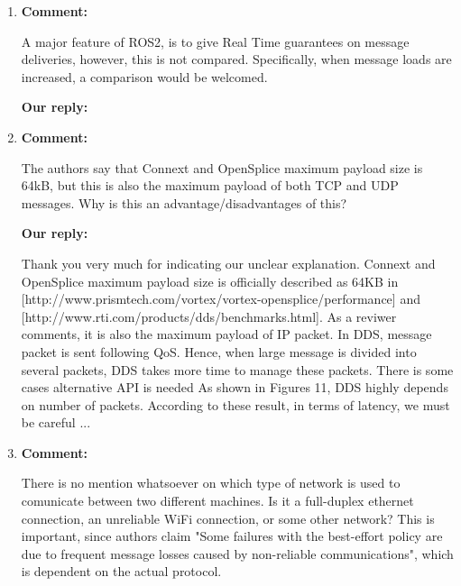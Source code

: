 \documentclass{article}
\begin{document}
\begin{enumerate}
\item \begin{flushleft}
    \textbf{Comment:}
  \end{flushleft}
  A major feature of ROS2, is to give Real Time guarantees on message deliveries, however, this is not compared. Specifically, when message loads are increased, a comparison would be welcomed.

  \begin{flushleft}
    \textbf{Our reply:}
  \end{flushleft}

\item \begin{flushleft}
    \textbf{Comment:}
  \end{flushleft}
  The authors say that Connext and OpenSplice maximum payload size is 64kB, but this is also the maximum payload of both TCP and UDP messages. Why is this an advantage/disadvantages of this?

  \begin{flushleft}
    \textbf{Our reply:}
  \end{flushleft}
  Thank you very much for indicating our unclear explanation.
  Connext and OpenSplice maximum payload size is officially described as 64KB in [http://www.prismtech.com/vortex/vortex-opensplice/performance] and [http://www.rti.com/products/dds/benchmarks.html].
  As a reviwer comments, it is also the maximum payload of IP packet.
  In DDS, message packet is sent following QoS.
  Hence, when large message is divided into several packets, DDS takes more time to manage these packets.
  There is some cases alternative API is needed 
  As shown in Figures 11, DDS highly depends on number of packets.
  According to these result, in terms of latency, we must be careful ...

\item \begin{flushleft}
    \textbf{Comment:}
  \end{flushleft}
  There is no mention whatsoever on which type of network is used to comunicate between two different machines. Is it a full-duplex ethernet connection, an unreliable WiFi connection, or some other network?
  This is important, since authors claim "Some failures with the best-effort policy are due to frequent message losses caused by non-reliable communications", which is dependent on the actual protocol.


\end{enumerate}
\end{document}
